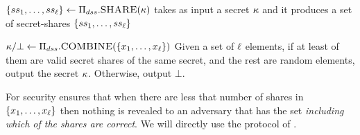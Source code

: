 \itemListStart
\item $\{ ss_{1},\dots, ss_{\ell} \} \gets \Pi_{dss}.\textsc{SHARE}(\kappa)$ takes as input a secret $\kappa$ and it produces a set of secret-shares $\{ ss_{1},\dots, ss_{\ell} \}$
\item $\genericSymmKey/\bot \gets \dssProtocol.\SSCombine(\{\genericSetElmt[1], \dots, \genericSetElmt[\genericVecLen] \})$ Given a set of $\ell$ elements, if at least \threshold of them are valid secret shares of the same secret, and the rest are random elements, output the secret $\kappa$. Otherwise, output $\bot$. 
\itemListEnd

For security \dssProtocol ensures that when there are less that \threshold number of shares in $\{\genericSetElmt[1], \dots, \genericSetElmt[\genericVecLen] \}$ then nothing is revealed to an adversary that has the set \emph{including which of the shares are correct}. We will directly use the protocol of \citet{bhowmick2021apple}. 










